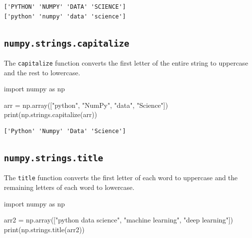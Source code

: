\documentclass[
  english,
  letterpaper,
  DIV=11,
  numbers=noendperiod]{scrreprt}
\newenvironment{Shaded}{\begin{snugshade}}{\end{snugshade}}
\newcommand{\BuiltInTok}[1]{\textcolor[rgb]{0.00,0.23,0.31}{#1}}
\newcommand{\ImportTok}[1]{\textcolor[rgb]{0.00,0.46,0.62}{#1}}
\newcommand{\NormalTok}[1]{\textcolor[rgb]{0.00,0.23,0.31}{#1}}
\newcommand{\OperatorTok}[1]{\textcolor[rgb]{0.37,0.37,0.37}{#1}}
\newcommand{\StringTok}[1]{\textcolor[rgb]{0.13,0.47,0.30}{#1}}
\begin{document}
\begin{verbatim}
['PYTHON' 'NUMPY' 'DATA' 'SCIENCE']
['python' 'numpy' 'data' 'science']
\end{verbatim}

\subsection{\texorpdfstring{\texttt{numpy.strings.capitalize}}{numpy.strings.capitalize}}\label{numpy.strings.capitalize}

The \texttt{capitalize} function converts the first letter of the entire
string to uppercase and the rest to lowercase.

\begin{Shaded}
\begin{Highlighting}[]
\ImportTok{import}\NormalTok{ numpy }\ImportTok{as}\NormalTok{ np}

\NormalTok{arr }\OperatorTok{=}\NormalTok{ np.array([}\StringTok{"python"}\NormalTok{, }\StringTok{"NumPy"}\NormalTok{, }\StringTok{"data"}\NormalTok{, }\StringTok{"Science"}\NormalTok{])}
\BuiltInTok{print}\NormalTok{(np.strings.capitalize(arr))}
\end{Highlighting}
\end{Shaded}

\begin{verbatim}
['Python' 'Numpy' 'Data' 'Science']
\end{verbatim}

\subsection{\texorpdfstring{\texttt{numpy.strings.title}}{numpy.strings.title}}\label{numpy.strings.title}

The \texttt{title} function converts the first letter of each word to
uppercase and the remaining letters of each word to lowercase.

\begin{Shaded}
\begin{Highlighting}[]
\ImportTok{import}\NormalTok{ numpy }\ImportTok{as}\NormalTok{ np}

\NormalTok{arr2 }\OperatorTok{=}\NormalTok{ np.array([}\StringTok{"python data science"}\NormalTok{, }\StringTok{"machine learning"}\NormalTok{, }\StringTok{"deep learning"}\NormalTok{])}
\BuiltInTok{print}\NormalTok{(np.strings.title(arr2))}
\end{Highlighting}
\end{Shaded}
\end{document}
